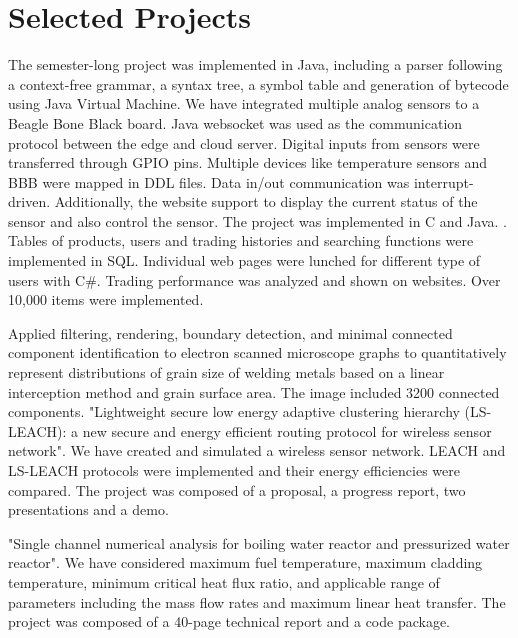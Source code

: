 \documentclass[11pt,a4paper,sans]{moderncv}
\begin{document}
\section{Selected Projects}
{The semester-long project was implemented in Java, including a parser following a context-free grammar, a syntax tree, a symbol table and generation of bytecode using Java Virtual Machine.}
{We have integrated multiple analog sensors to a Beagle Bone Black board. Java websocket was used as the communication protocol between the edge and cloud server. Digital inputs from sensors were transferred through GPIO pins. Multiple devices like temperature sensors and BBB were mapped in DDL files. Data in/out communication was interrupt-driven. Additionally, the website support to display the current status of the sensor and also control the sensor. The project was implemented in C and Java. .}
{Tables of products, users and trading histories and searching functions were implemented in SQL. Individual web pages were lunched for different type of users with C\#. Trading performance was analyzed and shown on websites. Over 10,000 items were implemented.}

{Applied filtering, rendering, boundary detection, and minimal connected component identification to electron scanned microscope graphs to quantitatively represent distributions of grain size of welding metals based on a linear interception method and grain surface area. The image included 3200 connected components.}
{"Lightweight secure low energy adaptive clustering hierarchy (LS-LEACH): a new secure and energy efficient routing protocol for wireless sensor network". We have created and simulated a wireless sensor network. LEACH and LS-LEACH protocols were implemented and their energy efficiencies were compared. The project was composed of a proposal, a progress report, two presentations and a demo. }

{"Single channel numerical analysis for boiling water reactor and pressurized water reactor". We have considered maximum fuel temperature, maximum cladding temperature, minimum critical heat flux ratio, and applicable range of parameters including the mass flow rates and maximum linear heat transfer. The project was composed of a 40-page technical report and a code package.}
\end{document}
